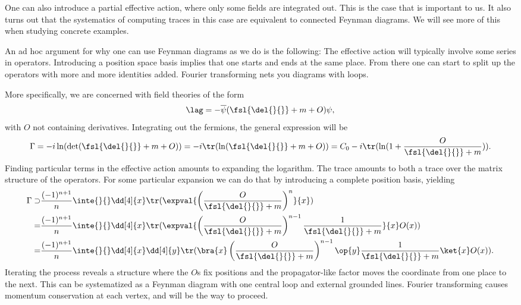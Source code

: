 One can also introduce a partial effective action, where only some fields are integrated out. This is the case that is important to us. It also turns out that the systematics of computing traces in this case are equivalent to connected Feynman diagrams. We will see more of this when studying concrete examples.

An ad hoc argument for why one can use Feynman diagrams as we do is the following: The effective action will typically involve some series in operators. Introducing a position space basis implies that one starts and ends at the same place. From there one can start to split up the operators with more and more identities added. Fourier transforming nets you diagrams with loops.

More specifically, we are concerned with field theories of the form
\begin{align*}
	\lag = -\overline{\psi}(\fsl{\del{}{}} + m + O)\psi,
\end{align*}
with $O$ not containing derivatives. Integrating out the fermions, the general expression will be
\begin{align*}
	\Gamma = -i\ln(\det(\fsl{\del{}{}} + m + O)) = -i\tr(\ln(\fsl{\del{}{}} + m + O)) = C_{0} - i\tr(\ln(1 + \frac{O}{\fsl{\del{}{}} + m})).
\end{align*}
Finding particular terms in the effective action amounts to expanding the logarithm. The trace amounts to both a trace over the matrix structure of the operators. For some particular expansion we can do that by introducing a complete position basis, yielding
\begin{align*}
	\Gamma \supset& \frac{(-1)^{n + 1}}{n}\inte{}{}\dd[4]{x}\tr(\expval{\left(\frac{O}{\fsl{\del{}{}} + m}\right)^{n}}{x}) \\
	             =& \frac{(-1)^{n + 1}}{n}\inte{}{}\dd[4]{x}\tr(\expval{\left(\frac{O}{\fsl{\del{}{}} + m}\right)^{n - 1}\frac{1}{\fsl{\del{}{}} + m}}{x}O(x)) \\
	             =& \frac{(-1)^{n + 1}}{n}\inte{}{}\dd[4]{x}\dd[4]{y}\tr(\bra{x}\left(\frac{O}{\fsl{\del{}{}} + m}\right)^{n - 1}\op{y}\frac{1}{\fsl{\del{}{}} + m}\ket{x}O(x)).
\end{align*}
Iterating the process reveals a structure where the $O$s fix positions and the propagator-like factor moves the coordinate from one place to the next. This can be systematized as a Feynman diagram with one central loop and external grounded lines. Fourier transforming causes momentum conservation at each vertex, and will be the way to proceed.

